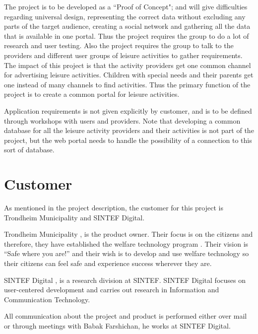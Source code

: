 The project is to be developed as a “Proof of Concept"; and will give difficulties regarding universal design, representing the correct data without excluding any parts of the target audience, creating a social network and gathering all the data that is available in one portal. Thus the project requires the group to do a lot of research and user testing. Also the project requires the group to talk to the providers and different user groups of leisure activities to gather requirements. The impact of this project is that the activity providers get one common channel for advertising leisure activities. Children with special needs and their parents get one instead of many channels to find activities. Thus the primary function of the project is to create a common portal for leisure activities.

Application requirements is not given explicitly by customer, and is to be defined through workshops with users and providers. Note that developing a common database for all the leisure activity providers and their activities is not part of the project, but the web portal needs to handle the possibility of a connection to this sort of database.  

\section{Customer}
As mentioned in the project description, the customer for this project is Trondheim Municipality and SINTEF Digital.

Trondheim Municipality \cite{TrondheimMunicipality}, is the product owner. Their focus is on the citizens and therefore, they have established the welfare technology program \cite{WelfareProgram}. Their vision is “Safe where you are!” and their wish is to develop and use welfare technology so their citizens can feel safe and experience success wherever they are.

SINTEF Digital \cite{SintefDigital}, is a research division at SINTEF. SINTEF Digital focuses on user-centered development and carries out research in Information and Communication Technology.

All communication about the project and product is performed either over mail or through meetings with Babak Farshichan, he works at SINTEF Digital.


\cleardoublepage
